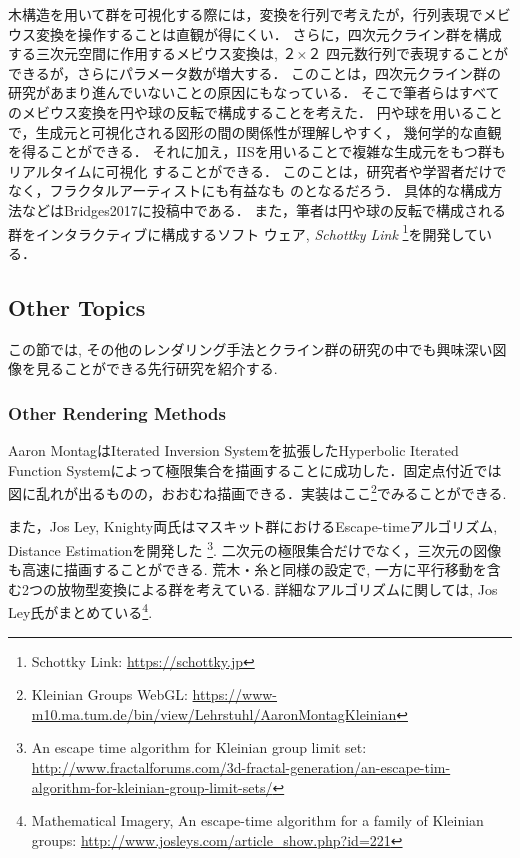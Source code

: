 木構造を用いて群を可視化する際には，変換を行列で考えたが，行列表現でメビ
ウス変換を操作することは直観が得にくい．
さらに，四次元クライン群を構成する三次元空間に作用するメビウス変換は, ２×２
四元数行列で表現することができるが，さらにパラメータ数が増大する．
このことは，四次元クライン群の研究があまり進んでいないことの原因にもなっている．
そこで筆者らはすべてのメビウス変換を円や球の反転で構成することを考えた．
円や球を用いることで，生成元と可視化される図形の間の関係性が理解しやすく，
幾何学的な直観を得ることができる．
それに加え，IISを用いることで複雑な生成元をもつ群もリアルタイムに可視化
することができる．
このことは，研究者や学習者だけでなく，フラクタルアーティストにも有益なも
のとなるだろう．
具体的な構成方法などはBridges2017に投稿中である．
また，筆者は円や球の反転で構成される群をインタラクティブに構成するソフト
ウェア, {\it Schottky Link} \footnote{Schottky Link: \url{https://schottky.jp}}を開発している．

\subsection{Other Topics}

この節では, その他のレンダリング手法とクライン群の研究の中でも興味深い図像を見ることができる先行研究を紹介する.

\subsubsection{Other Rendering Methods}
Aaron MontagはIterated Inversion Systemを拡張したHyperbolic Iterated Function Systemによって極限集合を描画することに成功した\cite{hyperbolicIFS}．固定点付近では図に乱れが出るものの，おおむね描画できる．実装はここ\footnote{Kleinian Groups WebGL: \url{https://www-m10.ma.tum.de/bin/view/Lehrstuhl/AaronMontagKleinian}}でみることができる.

また，Jos Ley, Knighty両氏はマスキット群におけるEscape-timeアルゴリズム, Distance Estimationを開発した
\footnote{An escape time algorithm for Kleinian group limit set:\\ \quad
\quad \url{http://www.fractalforums.com/3d-fractal-generation/an-escape-tim-algorithm-for-kleinian-group-limit-sets/}}.
 二次元の極限集合だけでなく，三次元の図像も高速に描画することができる.
荒木・糸\cite{maskit}と同様の設定で, 一方に平行移動を含む2つの放物型変換による群を考えている.
詳細なアルゴリズムに関しては, Jos Ley氏がまとめている\footnote{Mathematical Imagery, An escape-time algorithm for a family of Kleinian groups: \url{http://www.josleys.com/article_show.php?id=221}}.

